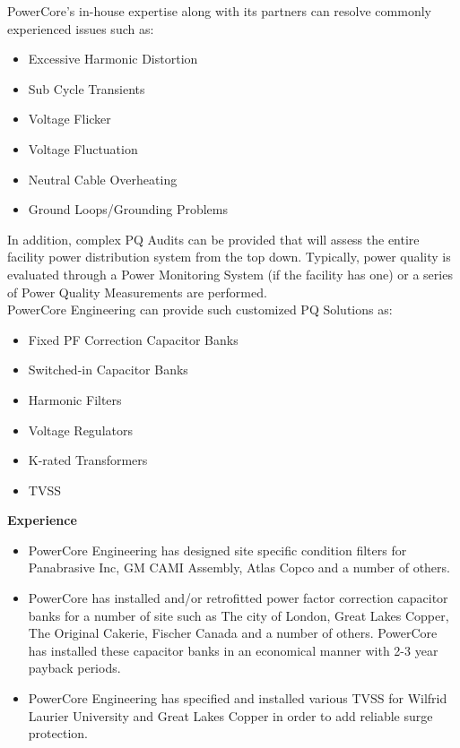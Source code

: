PowerCore's in-house expertise along with its partners can resolve commonly experienced issues such as:
\begin{itemize}
	\item Excessive Harmonic Distortion
	\item Sub Cycle Transients
	\item Voltage Flicker
	\item Voltage Fluctuation
	\item Neutral Cable Overheating
	\item Ground Loops/Grounding Problems
\end{itemize}

In addition, complex PQ Audits can be provided that will assess the entire facility power distribution system from the top down. Typically, power quality is evaluated through a Power Monitoring System (if the facility has one) or a series of Power Quality Measurements are performed. \\

PowerCore Engineering can provide such customized PQ Solutions as:
\begin{itemize}
	\item Fixed PF Correction Capacitor Banks
	\item Switched-in Capacitor Banks
	\item Harmonic Filters
	\item Voltage Regulators
	\item K-rated Transformers
	\item TVSS
\end{itemize}


\textbf{Experience}\\
\begin{itemize}
	\item PowerCore Engineering has designed site specific condition filters for Panabrasive Inc, GM CAMI Assembly, Atlas Copco and a number of others.
	\item PowerCore has installed and/or retrofitted power factor correction capacitor banks for a number of site such as The city of London, Great Lakes Copper, The Original Cakerie, Fischer Canada and a number of others. PowerCore has installed these capacitor banks in an economical manner with 2-3 year payback periods.
	\item PowerCore Engineering has specified and installed various TVSS for Wilfrid Laurier University and Great Lakes Copper in order to add reliable surge protection.  
\end{itemize}

